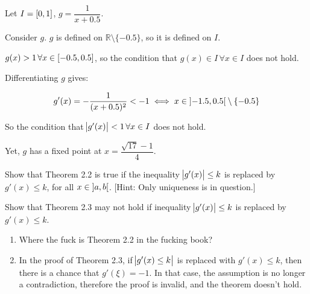 \documentclass[../../../../Assignments]{subfiles}
\begin{document}
\begin{solution}
    Let \(I = \interval{0}{1}\), \(g = \dfrac{1}{x + \num{0.5}}\).

    Consider \(g\). \(g\) is defined on \(\mathbb{R} \setminus \{\num{-0.5}\}\),
    so it is defined on \(I\).

    \(g(x) > 1 \, \forall x \in \interval{\num{-0.5}}{\num{0.5}}\), so the
    condition that \(g(x) \in I \, \forall x \in I\) does not hold.

    Differentiating \(g\) gives:

    \[g'(x) = - \dfrac{1}{(x + \num{0.5})^2} < -1 \iff x \in \interval[open]{\num{-1.5}}{\num{0.5}} \setminus \{\num{-0.5}\}\]

    So the condition that \(\abs{g'(x)} < 1 \, \forall x \in I\) does not hold.

    Yet, \(g\) has a fixed point at \(x = \dfrac{\sqrt{17} - 1}{4}\).
\end{solution}

\begin{exercise}
    \begin{tasks}
        \task Show that Theorem 2.2 is true if the inequality \(\abs{g'(x)} \leq
            k\) is replaced by \(g'(x) \leq k\), for all \(x \in
            \interval[open]{a}{b}\). [Hint: Only uniqueness is in question.]

        \task Show that Theorem 2.3 may not hold if inequality \(\abs{g'(x)}
            \leq k\) is replaced by \(g'(x) \leq k\).
    \end{tasks}
\end{exercise}

\begin{solution}
    \begin{enumerate}[label = \alph*)]
        \item Where the fuck is Theorem 2.2 in the fucking book?
        \item In the proof of Theorem 2.3, if \(\abs{g'(x) \leq k}\) is replaced
            with \(g'(x) \leq k\), then there is a chance that \(g'(\xi) = -1\).
            In that case, the assumption is no longer a contradiction, therefore
            the proof is invalid, and the theorem doesn't hold.
    \end{enumerate}
\end{solution}
\end{document}
